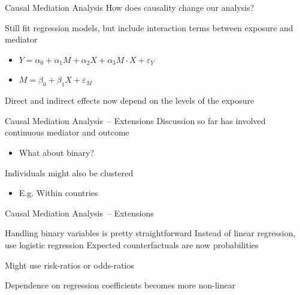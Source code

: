 \documentclass[14pt]{beamer}
\newcommand{\CMA}{Causal Mediation Analysis}
\begin{document}
\begin{frame}{\CMA}
    How does causality change our analysis? \newline

    Still fit regression models, but include interaction terms between exposure and mediator
    \begin{itemize}
        \item $Y = \alpha_0 + \alpha_1 M + \alpha_2 X + \alpha_3 M \cdot X + \varepsilon_Y$
        \item $M = \beta_0 + \beta_1 X + \varepsilon_M$ \newline
    \end{itemize}

    Direct and indirect effects now depend on the levels of the exposure

\end{frame}


\begin{frame}{\CMA\ -- Extensions}
    Discussion so far has involved continuous mediator and outcome
    \begin{itemize}
        \item What about binary? \newline
    \end{itemize}

    Individuals might also be clustered
    \begin{itemize}
        \item E.g. Within countries
    \end{itemize}

\end{frame}

\begin{frame}{\CMA\ -- Extensions}
    \begin{outline}
        \1 Handling binary variables is pretty straightforward
            \2 Instead of linear regression, use logistic regression
        \1 Expected  counterfactuals are now probabilities \newline

        \1 Might use risk-ratios or odds-ratios \newline

        \1 Dependence on regression coefficients becomes more non-linear


    \end{outline}

\end{frame}
\end{document}
